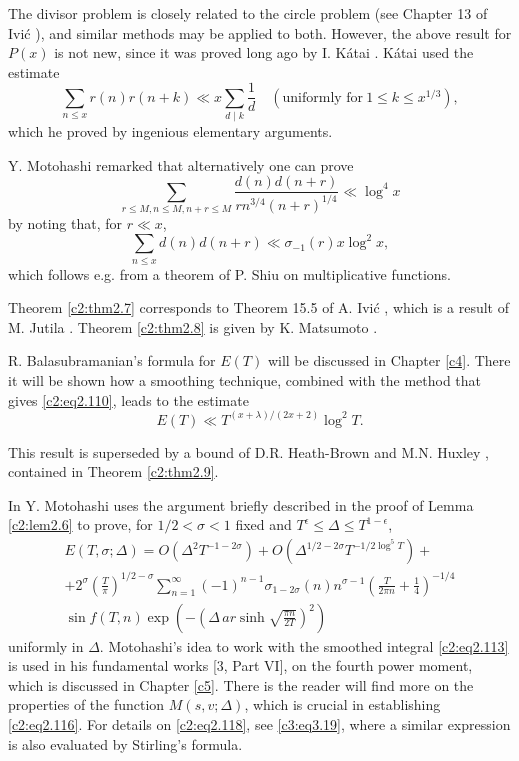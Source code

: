 The divisor problem is closely related to the circle problem (see
Chapter 13 of Ivi\'c \cite{Ivic1}), and similar methods may be applied to
both. However, the above result for $P(x)$ is not new, since it was
proved long ago by I. K\'atai \cite{Katai1}. K\'atai used the estimate
$$
\sum_{n \leq x} r(n) r(n+ k) \ll x \sum_{d \mid k} \frac{1}{d}
\quad (\text{uniformly for}~1 \leq k \leq x^{1/3}),
$$
which he proved by ingenious elementary arguments.

Y. Motohashi remarked that alternatively one can prove 
$$ 
\sum_{r \leq M, n\leq M, n+ r\leq M} \frac{d(n) d (n+r)}{r n^{3/4}
  (n+r)^{1/4}} \ll \log^4 x 
$$
by noting that, for $r \ll x$,
$$
\sum_{n \leq x} d(n) d(n+r) \ll \sigma_{-1} (r) x \log^2 x,
$$
which follows e.g. from a theorem of P. Shiu \cite{Shiu1} on
multiplicative functions.\pageoriginale

Theorem \ref{c2:thm2.7} corresponds to Theorem 15.5 of A. Ivi\'c
\cite{Ivic1}, which is a result of M. Jutila \cite{Jutila1}. Theorem
\ref{c2:thm2.8} is given by K. Matsumoto \cite{Matsumoto1}.

R. Balasubramanian's formula \cite{Balasubramanian1} for $E(T)$ will be discussed in
Chapter \ref{c4}. There it will be shown how a smoothing technique, combined
with the method that gives \eqref{c2:eq2.110}, leads to the estimate
$$ 
E(T) \ll T^{(x + \lambda)/(2 x + 2)} \log^2 T.
$$

This result is superseded by a bound of D.R. Heath-Brown and
M.N. Huxley \cite{Heath-Brown and Huxley1}, contained in Theorem \ref{c2:thm2.9}.

In \cite{Motohashi8} Y. Motohashi uses the argument briefly described in the
proof of Lemma \ref{c2:lem2.6} to prove, for $1/2 < \sigma < 1$ fixed
and $T^\epsilon \leq \Delta  \leq T^{1- \epsilon}$,
\begin{multline*}
  E(T, \sigma; \Delta ) = O\left(\Delta ^2 T^{-1- 2 \sigma}\right) +
  O\left(\Delta ^{1/2  - 2 \sigma} T^{-1/2 \log^5 T}\right)+\\
  + 2^\sigma \left(\frac{T}{\pi}\right)^{1/2 - \sigma}
  \sum_{n=1}^\infty (-1)^{n-1} \sigma_{1- 2 \sigma} (n) n^{\sigma-1}
  \left(\frac{T}{2 \pi n} + \frac{1}{4}\right)^{- 1/4}\\ 
  \sin f(T, n)
  \exp \left(-\left(\Delta\,  ar \sinh \sqrt{\frac{\pi n}{2T}}\right)^2\right) 
\end{multline*}
uniformly in $\Delta$. Motohashi's idea to work with the smoothed
integral \eqref{c2:eq2.113} is used in his fundamental works [3, Part
  VI], \cite{Motohashi6} on the fourth power moment, which is discussed in
Chapter \ref{c5}. There is the reader will find more on the properties of the
function $M(s, v; \Delta )$, which is crucial in establishing
\eqref{c2:eq2.116}. For details on \eqref{c2:eq2.118}, see
\eqref{c3:eq3.19}, where a similar expression is also evaluated by
Stirling's formula.

